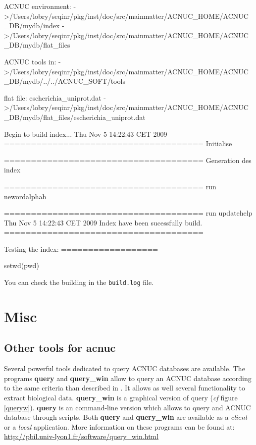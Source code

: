 \documentclass{article}
\begin{document}
\begin{itemize}
\begin{Schunk}
\begin{Soutput}
ACNUC environment:
 ->/Users/lobry/seqinr/pkg/inst/doc/src/mainmatter/ACNUC_HOME/ACNUC_DB/mydb/index
 ->/Users/lobry/seqinr/pkg/inst/doc/src/mainmatter/ACNUC_HOME/ACNUC_DB/mydb/flat_files
 
ACNUC tools in:
 ->/Users/lobry/seqinr/pkg/inst/doc/src/mainmatter/ACNUC_HOME/ACNUC_DB/mydb/../../ACNUC_SOFT/tools
 
flat file: escherichia_uniprot.dat
 ->/Users/lobry/seqinr/pkg/inst/doc/src/mainmatter/ACNUC_HOME/ACNUC_DB/mydb/flat_files/escherichia_uniprot.dat
 
Begin to build index...
Thu Nov  5 14:22:43 CET 2009
=====================================
Initialise

=====================================
Generation des index

=====================================
run newordalphab


=====================================
run updatehelp
Thu Nov  5 14:22:43 CET 2009
Index have been sucessfully build.
=====================================
 
Testing the index:
==================
\end{Soutput}
\begin{Sinput}
 setwd(pwd)
\end{Sinput}
\end{Schunk}
You can check the building in the \texttt{build.log} file.

\end{itemize}




\section{Misc} 

\subsection{Other tools for acnuc}

Several powerful tools dedicated to query ACNUC databases are available. 
The programs \textbf{query} and \textbf{query\_win} allow to query an ACNUC database according to the same
criteria than described  in \seqinr{}. It allows as well several functionality to extract biological data.
\textbf{query\_win} is a graphical version of query (\textit{cf} figure \ref{queryw}).
\textbf{query} is an command-line version which allows to query and ACNUC database through scripts.
Both \textbf{query} and  \textbf{query\_win} are available as a
\textit{client} or a \textit{local} application. More information on these programs can be found at:
\url{http://pbil.univ-lyon1.fr/software/query_win.html}
\end{document}
